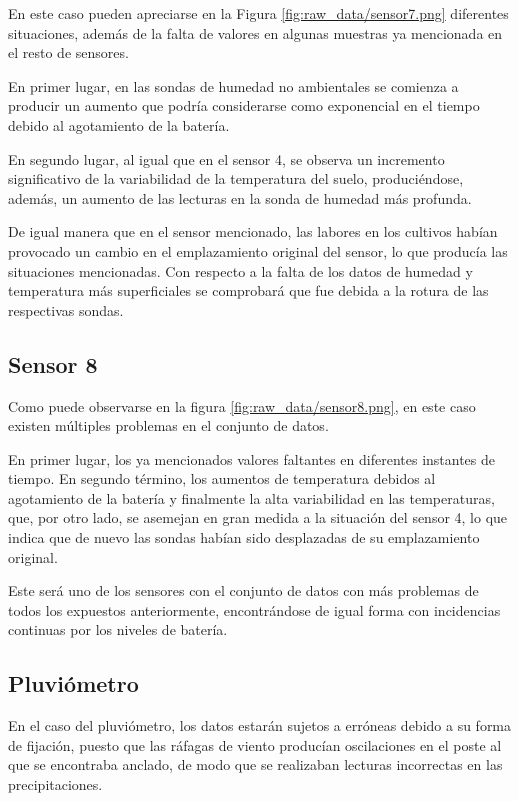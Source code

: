 
En este caso pueden apreciarse en la Figura \ref{fig:raw_data/sensor7.png} diferentes
situaciones, además de la falta de valores en algunas muestras ya mencionada en el 
resto de sensores.

En primer lugar, en las sondas de humedad no ambientales se comienza a producir un aumento
que podría considerarse como exponencial en el tiempo debido al agotamiento de la batería.

En segundo lugar, al igual que en el sensor 4, se observa un incremento significativo de la variabilidad
de la temperatura del suelo, produciéndose, además, un aumento de las lecturas en la sonda de
humedad más profunda.

De igual manera que en el sensor mencionado, las labores en los cultivos habían provocado un
cambio en el emplazamiento original del sensor, lo que producía las situaciones mencionadas.
Con respecto a la falta de los datos de humedad y temperatura más superficiales se 
comprobará que fue debida a la rotura de las respectivas sondas.

\newpage
\subsection{Sensor 8}


Como puede observarse en la figura \ref{fig:raw_data/sensor8.png}, en este caso existen 
múltiples problemas en el conjunto de datos.

En primer lugar, los ya mencionados valores faltantes en diferentes instantes de tiempo.
En segundo término, los aumentos de temperatura debidos al agotamiento de la batería y finalmente
la alta variabilidad en las temperaturas, que, por otro lado, se asemejan en gran medida a la situación 
del sensor 4,
lo que indica que de nuevo las sondas habían sido desplazadas de su emplazamiento original.

Este será uno de los sensores con el conjunto de datos con más problemas de todos los 
expuestos anteriormente, encontrándose de igual forma con incidencias continuas por los niveles
de batería.

\newpage
\subsection{Pluviómetro}


En el caso del pluviómetro, los datos estarán sujetos a erróneas debido a su forma
de fijación, puesto que las ráfagas de viento producían oscilaciones
en el poste al que se encontraba anclado, de modo que se realizaban lecturas incorrectas
en las precipitaciones.

